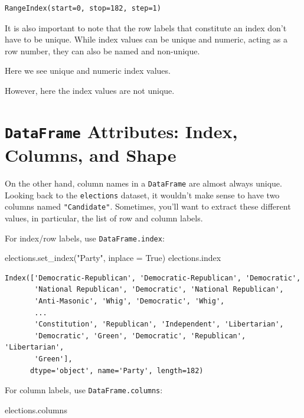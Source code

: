 \documentclass[
  letterpaper,
  DIV=11,
  numbers=noendperiod]{scrreprt}
\newenvironment{Shaded}{\begin{snugshade}}{\end{snugshade}}
\newcommand{\NormalTok}[1]{\textcolor[rgb]{0.00,0.23,0.31}{#1}}
\newcommand{\OperatorTok}[1]{\textcolor[rgb]{0.37,0.37,0.37}{#1}}
\newcommand{\StringTok}[1]{\textcolor[rgb]{0.13,0.47,0.30}{#1}}
\newcommand{\VariableTok}[1]{\textcolor[rgb]{0.07,0.07,0.07}{#1}}
\begin{document}
\begin{verbatim}
RangeIndex(start=0, stop=182, step=1)
\end{verbatim}

It is also important to note that the row labels that constitute an
index don't have to be unique. While index values can be unique and
numeric, acting as a row number, they can also be named and non-unique.

Here we see unique and numeric index values.

However, here the index values are not unique.

\hypertarget{dataframe-attributes-index-columns-and-shape}{%
\section{\texorpdfstring{\texttt{DataFrame} Attributes: Index, Columns,
and
Shape}{DataFrame Attributes: Index, Columns, and Shape}}\label{dataframe-attributes-index-columns-and-shape}}

On the other hand, column names in a \texttt{DataFrame} are almost
always unique. Looking back to the \texttt{elections} dataset, it
wouldn't make sense to have two columns named \texttt{"Candidate"}.
Sometimes, you'll want to extract these different values, in particular,
the list of row and column labels.

For index/row labels, use \texttt{DataFrame.index}:

\begin{Shaded}
\begin{Highlighting}[]
\NormalTok{elections.set\_index(}\StringTok{"Party"}\NormalTok{, inplace }\OperatorTok{=} \VariableTok{True}\NormalTok{)}
\NormalTok{elections.index}
\end{Highlighting}
\end{Shaded}

\begin{verbatim}
Index(['Democratic-Republican', 'Democratic-Republican', 'Democratic',
       'National Republican', 'Democratic', 'National Republican',
       'Anti-Masonic', 'Whig', 'Democratic', 'Whig',
       ...
       'Constitution', 'Republican', 'Independent', 'Libertarian',
       'Democratic', 'Green', 'Democratic', 'Republican', 'Libertarian',
       'Green'],
      dtype='object', name='Party', length=182)
\end{verbatim}

For column labels, use \texttt{DataFrame.columns}:

\begin{Shaded}
\begin{Highlighting}[]
\NormalTok{elections.columns}
\end{Highlighting}
\end{Shaded}
\end{document}
